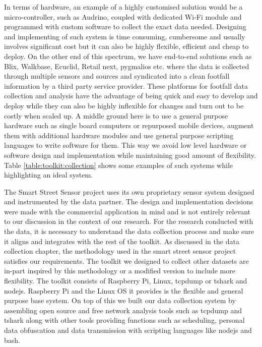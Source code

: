 In terms of hardware, an example of a highly customised solution would be a micro-controller, such as Audrino, coupled with dedicated Wi-Fi module and programmed with custom software to collect the exact data needed.
Designing and implementing of such system is time consuming, cumbersome and usually involves significant cost but it can also be highly flexible, efficient and cheap to deploy.
On the other end of this spectrum, we have end-to-end solutions such as Blix, Walkbase, Ecuclid, Retail next, pygmalios etc. where the data is collected through multiple sensors and sources and syndicated into a clean footfall information by a third party service provider.
These platforms for footfall data collection and analysis have the advantage of being quick and easy to develop and deploy while they can also be highly inflexible for changes and turn out to be costly when scaled up.
A middle ground here is to use a general purpose hardware such as single board computers or repurposed mobile devices, augment them with additional hardware modules and use general purpose scripting languages to write software for them.
This way we avoid low level hardware or software design and implementation while maintaining good amount of flexibility.
Table \ref{table:toolkit:collection} shows some examples of such systems while highlighting an ideal system.

The Smart Street Sensor project uses its own proprietary sensor system designed and instrumented by the data partner.
The design and implementation decisions were made with the commercial application in mind and is not entirely relevant to our discussion in the context of our research.
For the research conducted with the data, it is necessary to understand the data collection process and make sure it aligns and integrates with the rest of the toolkit.
As discussed in the data collection chapter, the methodology used in the smart street sensor project satisfies our requirements.
The toolkit we designed to collect other datasets are in-part inspired by this methodology or a modified version to include more flexibility.
The toolkit consists of Raspberry Pi, Linux, tcpdump or tshark and nodejs.
Raspberry Pi and the Linux OS it provides is the flexible and general purpose base system.
On top of this we built our data collection system by assembling open source and free network analysis tools such as tcpdump and tshark along with other tools providing functions such as scheduling, personal data obfuscation and data transmission with scripting languages like nodejs and bash.

